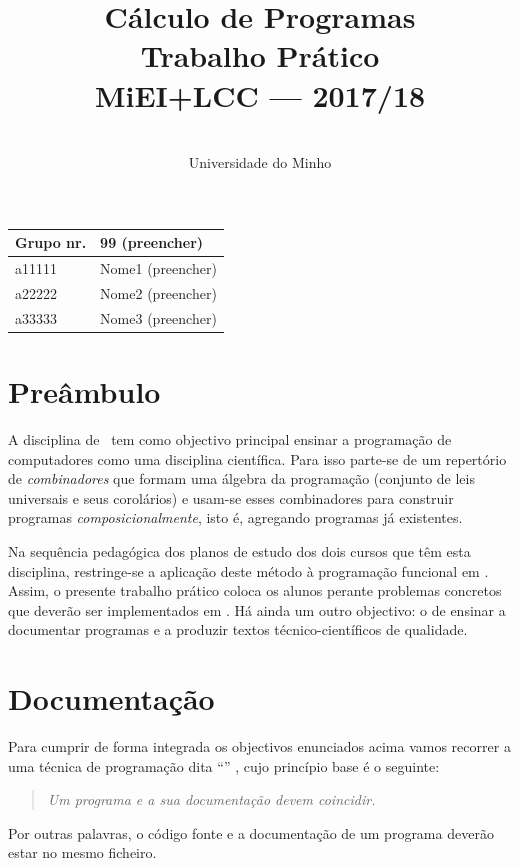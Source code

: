 \documentclass[a4paper]{article}
\title{
       	    Cálculo de Programas
\\
       	Trabalho Prático
\\
       	MiEI+LCC --- 2017/18
}
\author{
       	\dium
\\
       	Universidade do Minho
}
\date\mydate
\begin{document}
\maketitle

\begin{center}\large
\begin{tabular}{ll}
\textbf{Grupo} nr. & 99 (preencher)
\\\hline
a11111 & Nome1 (preencher)	
\\
a22222 & Nome2 (preencher)	
\\
a33333 & Nome3 (preencher)	
\end{tabular}
\end{center}

\section{Preâmbulo}

A disciplina de \CP\ tem como objectivo principal ensinar
a progra\-mação de computadores como uma disciplina científica. Para isso
parte-se de um repertório de \emph{combinadores} que formam uma álgebra da
programação (conjunto de leis universais e seus corolários) e usam-se esses
combinadores para construir programas \emph{composicionalmente}, isto é,
agregando programas já existentes.
  
Na sequência pedagógica dos planos de estudo dos dois cursos que têm esta
disciplina, restringe-se a aplicação deste método à programação funcional
em \Haskell. Assim, 
o presente trabalho prático coloca os alunos perante problemas
concretos que deverão ser implementados em \Haskell.
Há ainda um outro objectivo: o de ensinar a documentar programas e
a produzir textos técnico-científicos de qualidade.

\section{Documentação}
Para cumprir de forma integrada os objectivos enunciados acima vamos recorrer
a uma técnica de programa\-ção dita ``'' \cite{Kn92}, cujo
princípio base é o seguinte:
\begin{quote}\em
Um programa e a sua documentação devem coincidir.
\end{quote}
Por outras palavras, o código fonte e a documentação de um programa deverão estar no
mesmo ficheiro.
\end{document}
